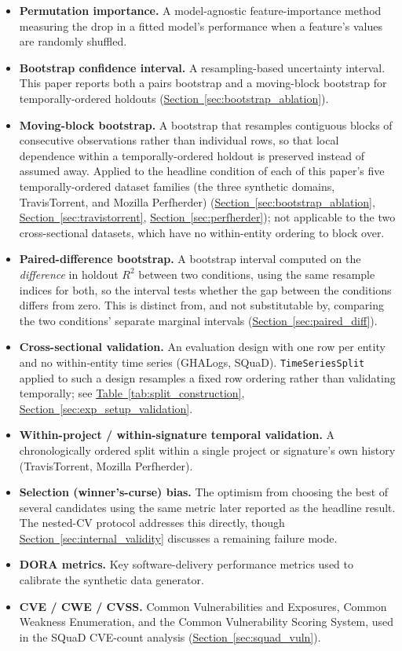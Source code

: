 \documentclass[technologies,article,submit,pdftex,moreauthors]{Definitions/mdpi}
\begin{document}
\begin{itemize}
\item
  \textbf{Permutation importance.} A model-agnostic feature-importance method measuring the drop in a fitted model's performance when a feature's values are randomly shuffled.
\item
  \textbf{Bootstrap confidence interval.} A resampling-based uncertainty interval. This paper reports both a pairs bootstrap and a moving-block bootstrap for temporally-ordered holdouts (\hyperref[sec:bootstrap_ablation]{Section~\ref*{sec:bootstrap_ablation}}).
\item
  \textbf{Moving-block bootstrap.} A bootstrap that resamples contiguous blocks of consecutive observations rather than individual rows, so that local dependence within a temporally-ordered holdout is preserved instead of assumed away. Applied to the headline condition of each of this paper's five temporally-ordered dataset families (the three synthetic domains, TravisTorrent, and Mozilla Perfherder) (\hyperref[sec:bootstrap_ablation]{Section~\ref*{sec:bootstrap_ablation}}, \hyperref[sec:travistorrent]{Section~\ref*{sec:travistorrent}}, \hyperref[sec:perfherder]{Section~\ref*{sec:perfherder}}); not applicable to the two cross-sectional datasets, which have no within-entity ordering to block over.
\item
  \textbf{Paired-difference bootstrap.} A bootstrap interval computed on the \emph{difference} in holdout \(R^2\) between two conditions, using the same resample indices for both, so the interval tests whether the gap between the conditions differs from zero. This is distinct from, and not substitutable by, comparing the two conditions' separate marginal intervals (\hyperref[sec:paired_diff]{Section~\ref*{sec:paired_diff}}).
\item
  \textbf{Cross-sectional validation.} An evaluation design with one row per entity and no within-entity time series (GHALogs, SQuaD). \texttt{TimeSeriesSplit} applied to such a design resamples a fixed row ordering rather than validating temporally; see \hyperref[tab:split_construction]{Table~\ref*{tab:split_construction}}, \hyperref[sec:exp_setup_validation]{Section~\ref*{sec:exp_setup_validation}}.
\item
  \textbf{Within-project / within-signature temporal validation.} A chronologically ordered split within a single project or signature's own history (TravisTorrent, Mozilla Perfherder).
\item
  \textbf{Selection (winner's-curse) bias.} The optimism from choosing the best of several candidates using the same metric later reported as the headline result. The nested-CV protocol addresses this directly, though \hyperref[sec:internal_validity]{Section~\ref*{sec:internal_validity}} discusses a remaining failure mode.
\item
  \textbf{DORA metrics.} Key software-delivery performance metrics used to calibrate the synthetic data generator.
\item
  \textbf{CVE / CWE / CVSS.} Common Vulnerabilities and Exposures, Common Weakness Enumeration, and the Common Vulnerability Scoring System, used in the SQuaD CVE-count analysis (\hyperref[sec:squad_vuln]{Section~\ref*{sec:squad_vuln}}).
\end{itemize}
\end{document}
